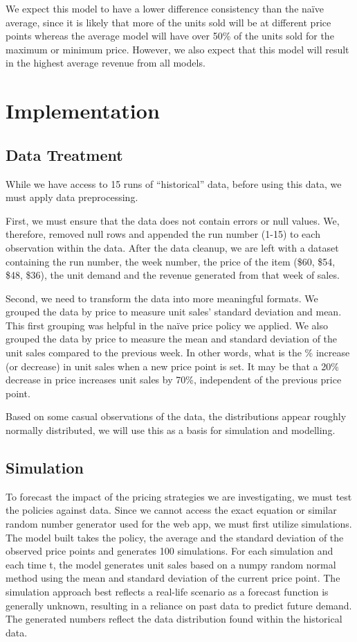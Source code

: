\documentclass[11pt,a4paper]{article}
\begin{document}
We expect this model to have a lower difference consistency than the naïve average, since it is likely that more of the units sold will be at different price points whereas the average model will have over 50\% of the units sold for the maximum or minimum price. 
However, we also expect that this model will result in the highest average revenue from all models.

\section{Implementation}

\subsection{Data Treatment}
While we have access to 15 runs of “historical” data, before using this data, we must apply data preprocessing. 

First, we must ensure that the data does not contain errors or null values. 
We, therefore, removed null rows and appended the run number (1-15) to each observation within the data. 
After the data cleanup, we are left with a dataset containing the run number, the week number, the price of the item (\$60, \$54, \$48, \$36), the unit demand and the revenue generated from that week of sales. 

Second, we need to transform the data into more meaningful formats. 
We grouped the data by price to measure unit sales’ standard deviation and mean. 
This first grouping was helpful in the naïve price policy we applied. 
We also grouped the data by price to measure the mean and standard deviation of the unit sales compared to the previous week. 
In other words, what is the \% increase (or decrease) in unit sales when a new price point is set. It may be that a 20\% decrease in price increases unit sales by 70\%, independent of the previous price point. 

Based on some casual observations of the data, the distributions appear roughly normally distributed, we will use this as a basis for simulation and modelling. 

\subsection{Simulation}
To forecast the impact of the pricing strategies we are investigating, we must test the policies against data. 
Since we cannot access the exact equation or similar random number generator used for the web app, we must first utilize simulations. 
The model built takes the policy, the average and the standard deviation of the observed price points and generates 100 simulations. 
For each simulation and each time t, the model generates unit sales based on a numpy random normal method using the mean and standard deviation of the current price point. 
The simulation approach best reflects a real-life scenario as a forecast function is generally unknown, resulting in a reliance on past data to predict future demand. 
The generated numbers reflect the data distribution found within the historical data. 
\end{document}
